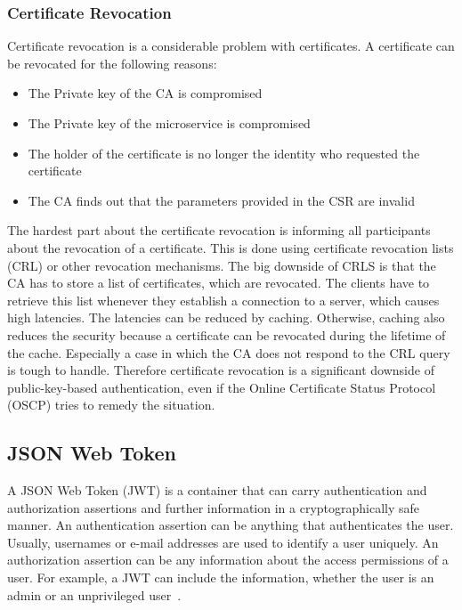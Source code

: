 \subsubsection{Certificate Revocation}
Certificate revocation is a considerable problem with certificates.
A certificate can be revocated for the following reasons: 
\begin{itemize}
    \item The Private key of the CA is compromised
    \item The Private key of the microservice is compromised
    \item The holder of the certificate is no longer the identity who requested the certificate 
    \item The CA finds out that the parameters provided in the CSR are invalid
\end{itemize}
The hardest part about the certificate revocation is informing all participants about the revocation of a certificate.
This is done using certificate revocation lists (CRL) or other revocation mechanisms.
The big downside of CRLS is that the CA has to store a list of certificates, which are revocated.
The clients have to retrieve this list whenever they establish a connection to a server, which causes high latencies.
The latencies can be reduced by caching.
Otherwise, caching also reduces the security because a certificate can be revocated during the lifetime of the cache.
Especially a case in which the CA does not respond to the CRL query is tough to handle.
Therefore certificate revocation is a significant downside of public-key-based authentication, even if the Online Certificate Status Protocol (OSCP) tries to remedy the situation\cite{dias2020microservices}.


\subsection{JSON Web Token}
A JSON Web Token (JWT) is a container that can carry authentication and authorization assertions and further information in a cryptographically safe manner.
An authentication assertion can be anything that authenticates the user.
Usually, usernames or e-mail addresses are used to identify a user uniquely.
An authorization assertion can be any information about the access permissions of a user.
For example, a JWT can include the information, whether the user is an admin or an unprivileged user~\cite{dias2020microservices}. 

